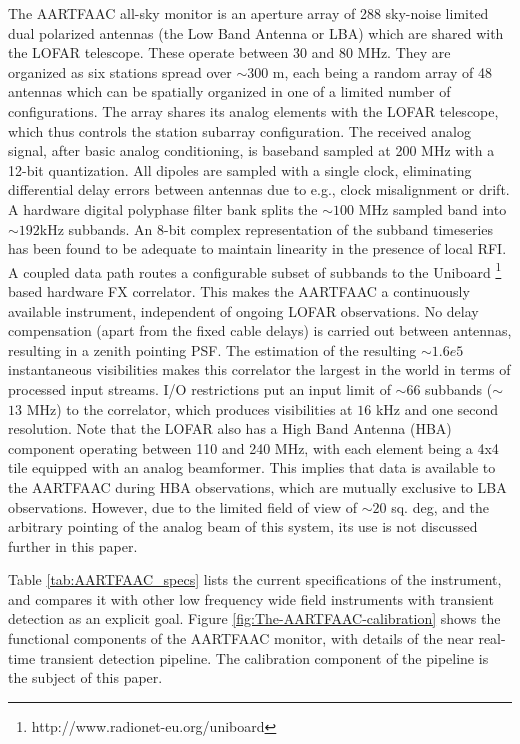 \documentclass{aa}
\begin{document}
The AARTFAAC all-sky monitor is an  aperture array of 288 sky-noise limited dual
polarized antennas (the Low Band Antenna or LBA) which are shared with the LOFAR
telescope.  These  operate between  30 and  80 MHz.  They  are organized  as six
stations spread  over $\sim$$300$ m,  each being a  random array of  48 antennas
which can be  spatially organized in one of a  limited number of configurations.
The  array shares  its  analog elements  with  the LOFAR  telescope, which  thus
controls the station subarray  configuration.  The received analog signal, after
basic  analog  conditioning,  is baseband  sampled  at  200  MHz with  a  12-bit
quantization.   All  dipoles  are  sampled  with  a  single  clock,  eliminating
differential delay  errors between antennas  due to e.g., clock  misalignment or
drift.   A hardware  digital polyphase  filter bank  splits the  $\sim$$100$ MHz
sampled band  into $\sim$$192$kHz subbands.  An 8-bit  complex representation of
the subband  timeseries has been found  to be adequate to  maintain linearity in
the presence of local RFI.  A  coupled data path routes a configurable subset of
subbands  to the  Uniboard  \footnote{http://www.radionet-eu.org/uniboard} based
hardware  FX  correlator.  This  makes  the  AARTFAAC  a continuously  available
instrument, independent  of ongoing  LOFAR observations.  No  delay compensation
(apart from the  fixed cable delays) is carried  out between antennas, resulting
in  a  zenith pointing  PSF.   The  estimation  of the  resulting  $\sim$$1.6e5$
instantaneous  visibilities makes this correlator  the largest  in the  world in
terms  of  processed input  streams.  I/O restrictions  put  an  input limit  of
$\sim$$66$  subbands   ($\sim$$13$  MHz)  to  the   correlator,  which  produces
visibilities at $16$ kHz and one second resolution. Note that the LOFAR also has
a High Band Antenna (HBA) component operating between 110 and 240 MHz, with each
element being a  4x4 tile equipped with an analog  beamformer. This implies that
data is  available to the AARTFAAC  during HBA observations,  which are mutually
exclusive to  LBA observations.  However,  due to the  limited field of  view of
$\sim$$20$  sq. deg,  and the  arbitrary  pointing of  the analog  beam of  this
system, its use is not discussed further in this paper.

Table   \ref{tab:AARTFAAC_specs}  lists  the   current  specifications   of  the
instrument, and compares it with other low frequency wide field instruments with
transient      detection       as      an      explicit       goal.       Figure
\ref{fig:The-AARTFAAC-calibration}  shows  the   functional  components  of  the
AARTFAAC  monitor,  with  details  of  the near  real-time  transient  detection
pipeline.   The calibration component  of the  pipeline is  the subject  of this
paper.
\end{document}
